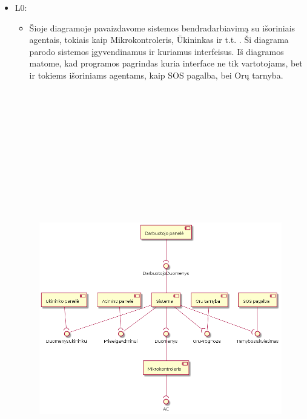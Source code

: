 \documentclass[oneside]{VUMIFPSkursinis}
\begin{document}
	\begin{itemize}
	\item L0:
	\begin{itemize}
	\item Šioje diagramoje pavaizdavome sistemos bendradarbiavimą su išoriniais agentais, tokiais kaip Mikrokontroleris, Ūkininkas ir t.t. . Ši diagrama parodo sistemos įgyvendinamus ir kuriamus interfeisus. Iš diagramos matome, kad programos pagrindas kuria interface ne tik vartotojams, bet ir tokiems išoriniams agentams, kaip SOS pagalba, bei Orų tarnyba.
\end{itemize}
	\begin{figure}[H]
		\centering	
	\includegraphics[width=17cm,height=20cm,keepaspectratio]{L1V2.png}
	\caption{}
	\label{fig:L1V2}
\end{figure}

\end{itemize}
\end{document}
